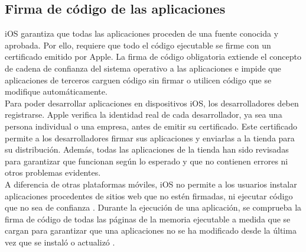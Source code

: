 \subsection{Firma de código de las aplicaciones}
iOS garantiza que todas las aplicaciones proceden de una fuente conocida y aprobada. Por ello, requiere que todo el código ejecutable se firme con un certificado emitido por Apple. La firma de código obligatoria extiende el concepto de cadena de confianza del sistema operativo a las aplicaciones e impide que aplicaciones de terceros carguen código sin firmar o utilicen código que se modifique automáticamente.\\
Para poder desarrollar aplicaciones en dispositivos iOS, los desarrolladores deben registrarse. Apple verifica la identidad real de cada desarrollador, ya sea una persona individual o una empresa, 
antes de emitir su certificado. Este certificado permite a los desarrolladores firmar sus aplicaciones y enviarlas a la tienda para su distribución. Además, todas las aplicaciones de la tienda han sido revisadas para garantizar que funcionan según lo esperado y que no contienen errores ni otros problemas evidentes.\\
A diferencia de otras plataformas móviles, iOS no permite a los usuarios instalar aplicaciones procedentes de sitios web que no estén firmadas, ni ejecutar código que no sea de confianza \cite{asg}. Durante la ejecución de una aplicación, se comprueba la firma de código de todas las páginas de la memoria ejecutable a medida que se cargan para garantizar que una aplicaciones no se ha modificado desde la última vez que se instaló o actualizó \cite{asg}.
